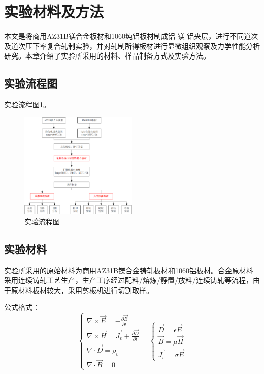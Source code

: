 \section{实验材料及方法}
本文是将商用AZ31B镁合金板材和1060纯铝板材制成铝-镁-铝夹层，进行不同道次及道次压下率复合轧制实验，并对轧制所得板材进行显微组织观察及力学性能分析研究。本章介绍了实验所采用的材料、样品制备方式及实验方法。\par
\subsection{实验流程图}
实验流程图\ref{fig:liuchengtu}。
\begin{figure}[H]
	\centering
	\includegraphics[width=0.5\textwidth]{images/liuchengtu.png}
	\caption{实验流程图}
	\label{fig:liuchengtu}
\end{figure}
\subsection{实验材料}
实验所采用的原始材料为商用AZ31B镁合金铸轧板材和1060铝板材。合金原材料采用连续铸轧工艺生产，生产工序经过配料/熔炼/静置/放料/连续铸轧等流程，由于原材料板材较大，采用剪板机进行切割取样。\par
公式格式：
\begin{equation}
\label{equ:maxwell}
    \begin{cases}
    \nabla\times\vec{E}=-\frac{\partial\vec{B}}{\partial t}\\
    \nabla\times\vec{H}=\vec{J_v}+\frac{\partial\vec{D}}{\partial t}\\
    \nabla\cdot\vec{D}=\rho_v\\
    \nabla\cdot\vec{B}=0
    \end{cases}\quad
    \begin{cases}
    \vec{D}=\epsilon\vec{E}\\
    \vec{B}=\mu\vec{H}\\
    \vec{J_v}=\sigma\vec{E}
    \end{cases}  
\end{equation}

